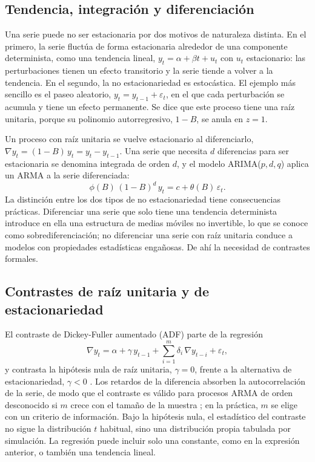 \subsection{Tendencia, integración y diferenciación}\label{sec:integracion}

Una serie puede no ser estacionaria por dos motivos de naturaleza distinta.
En el primero, la serie fluctúa de forma estacionaria alrededor de una
componente determinista, como una tendencia lineal,
$y_t = \alpha + \beta t + u_t$ con $u_t$ estacionario: las perturbaciones
tienen un efecto transitorio y la serie tiende a volver a la tendencia. En
el segundo, la no estacionariedad es estocástica. El ejemplo más sencillo es
el paseo aleatorio, $y_t = y_{t-1} + \varepsilon_t$, en el que cada
perturbación se acumula y tiene un efecto permanente. Se dice que este
proceso tiene una raíz unitaria, porque su polinomio autorregresivo,
$1 - B$, se anula en $z = 1$.

Un proceso con raíz unitaria se vuelve estacionario al diferenciarlo,
$\nabla y_t = (1 - B)\, y_t = y_t - y_{t-1}$. Una serie que necesita $d$
diferencias para ser estacionaria se denomina integrada de orden $d$, y el
modelo ARIMA($p,d,q$) aplica un ARMA a la serie diferenciada:
\begin{equation}
	\phi(B)\,(1 - B)^d\, y_t = c + \theta(B)\, \varepsilon_t.
\end{equation}
La distinción entre los dos tipos de no estacionariedad tiene consecuencias
prácticas. Diferenciar una serie que solo tiene una tendencia determinista
introduce en ella una estructura de medias móviles no invertible, lo que se
conoce como sobrediferenciación; no diferenciar una serie con raíz unitaria
conduce a modelos con propiedades estadísticas engañosas. De ahí la
necesidad de contrastes formales.

\subsection{Contrastes de raíz unitaria y de estacionariedad}\label{sec:raiz-unitaria}

El contraste de Dickey-Fuller aumentado (ADF) parte de la regresión
\begin{equation}
	\nabla y_t = \alpha + \gamma\, y_{t-1} + \sum_{i=1}^{m} \delta_i\, \nabla y_{t-i} + \varepsilon_t,
\end{equation}
y contrasta la hipótesis nula de raíz unitaria, $\gamma = 0$, frente a la
alternativa de estacionariedad, $\gamma < 0$
\parencite{dickey1979distribution}. Los retardos de la diferencia absorben la
autocorrelación de la serie, de modo que el contraste es válido para
procesos ARMA de orden desconocido si $m$ crece con el tamaño de la muestra
\parencite{said1984testing}; en la práctica, $m$ se elige con un criterio de
información. Bajo la hipótesis nula, el estadístico del contraste no sigue
la distribución $t$ habitual, sino una distribución propia tabulada por
simulación. La regresión puede incluir solo una constante, como en la
expresión anterior, o también una tendencia lineal.

